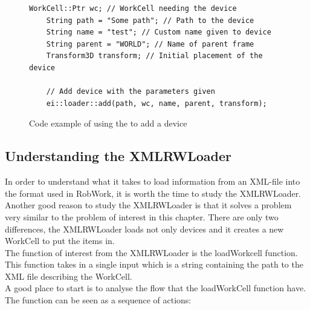 \begin{figure}[h]
	\centering
	\lstset{language=C++} 
	\begin{lstlisting}[frame=single]
	WorkCell::Ptr wc; // WorkCell needing the device
	String path = "Some path"; // Path to the device
	String name = "test"; // Custom name given to device
	String parent = "WORLD"; // Name of parent frame
	Transform3D transform; // Initial placement of the device
	
	// Add device with the parameters given
	ei::loader::add(path, wc, name, parent, transform);
	\end{lstlisting}
	\caption{Code example of using the to add a device}
	\label{fig:UseCodeExampleLoader}
\end{figure}


\subsection{Understanding the XMLRWLoader}
In order to understand what it takes to load information from an XML-file into the format used in RobWork, it is worth the time to study the XMLRWLoader. Another good reason to study the XMLRWLoader is that it solves a problem very similar to the problem of interest in this chapter. There are only two differences, the XMLRWLoader loads not only devices and it creates a new WorkCell to put the items in.\\

The function of interest from the XMLRWLoader is the loadWorkcell function. This function takes in a single input which is a string containing the path to the XML file describing the WorkCell.\\
A good place to start is to analyse the flow that the loadWorkCell function have. The function can be seen as a sequence of actions:

